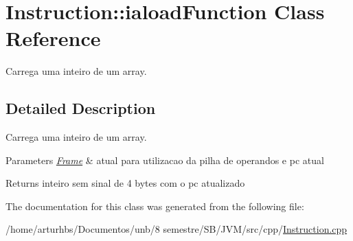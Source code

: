 \hypertarget{classInstruction_1_1ialoadFunction}{}\section{Instruction\+:\+:iaload\+Function Class Reference}
\label{classInstruction_1_1ialoadFunction}


Carrega uma inteiro de um array.  




\subsection{Detailed Description}
Carrega uma inteiro de um array. 


\begin{DoxyParams}{Parameters}
{\em \hyperlink{classFrame}{Frame}} & atual para utilizacao da pilha de operandos e pc atual \\
\hline
\end{DoxyParams}
\begin{DoxyReturn}{Returns}
inteiro sem sinal de 4 bytes com o pc atualizado 
\end{DoxyReturn}


The documentation for this class was generated from the following file\+:\begin{DoxyCompactItemize}
\item 
/home/arturhbs/\+Documentos/unb/8 semestre/\+S\+B/\+J\+V\+M/src/cpp/\hyperlink{Instruction_8cpp}{Instruction.\+cpp}\end{DoxyCompactItemize}
